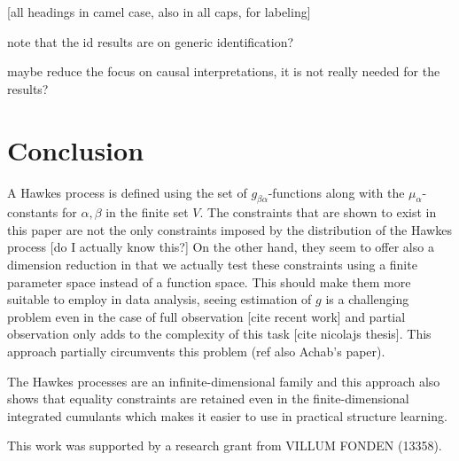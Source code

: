 \documentclass[accepted]{uai2021} %
\begin{document}
[all headings in camel case, also in all caps, for labeling]

note that the id results are on generic identification?

maybe reduce the focus on causal interpretations, it is not really needed for 
the results?


\section{Conclusion}

A Hawkes process is defined using the set of $g_{\beta\alpha}$-functions along 
with the $\mu_\alpha$-constants for $\alpha,\beta$ in the finite set $V$. The 
constraints that are shown to exist in this paper are not the only constraints 
imposed by the distribution of the Hawkes process [do I actually know this?] On 
the other hand, they seem to offer also a dimension reduction in that we 
actually test these constraints using a finite parameter space instead of a 
function space. This should make them more suitable to employ in data analysis, 
seeing estimation of $g$ is a challenging problem even in the case of full 
observation [cite recent work] and partial observation only adds to the 
complexity of this task [cite nicolajs thesis]. This approach partially 
circumvents this problem (ref also Achab's paper).

The Hawkes processes are an infinite-dimensional family and this approach also 
shows that equality constraints are retained even in the finite-dimensional 
integrated cumulants which makes it easier to use in practical structure 
learning.




\begin{contributions} %

\end{contributions}

\begin{acknowledgements} %
    This work was supported by a research grant from
    VILLUM FONDEN (13358).
\end{acknowledgements}
\end{document}

